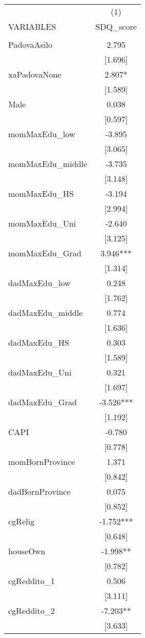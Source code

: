 \documentclass[]{article}
\begin{document}
\begin{tabular}{lc} \hline
 & (1) \\
VARIABLES & SDQ\_score \\ \hline
 &  \\
PadovaAsilo & 2.795 \\
 & [1.696] \\
xaPadovaNone & 2.807* \\
 & [1.589] \\
Male & 0.038 \\
 & [0.597] \\
momMaxEdu\_low & -3.895 \\
 & [3.065] \\
momMaxEdu\_middle & -3.735 \\
 & [3.148] \\
momMaxEdu\_HS & -3.194 \\
 & [2.994] \\
momMaxEdu\_Uni & -2.640 \\
 & [3.125] \\
momMaxEdu\_Grad & 3.946*** \\
 & [1.314] \\
dadMaxEdu\_low & 0.248 \\
 & [1.762] \\
dadMaxEdu\_middle & 0.774 \\
 & [1.636] \\
dadMaxEdu\_HS & 0.303 \\
 & [1.589] \\
dadMaxEdu\_Uni & 0.321 \\
 & [1.697] \\
dadMaxEdu\_Grad & -3.526*** \\
 & [1.192] \\
CAPI & -0.780 \\
 & [0.778] \\
momBornProvince & 1.371 \\
 & [0.842] \\
dadBornProvince & 0.075 \\
 & [0.852] \\
cgRelig & -1.752*** \\
 & [0.648] \\
houseOwn & -1.998** \\
 & [0.782] \\
cgReddito\_1 & 0.506 \\
 & [3.111] \\
cgReddito\_2 & -7.203** \\
 & [3.633] \\

\end{tabular}
\end{document}
